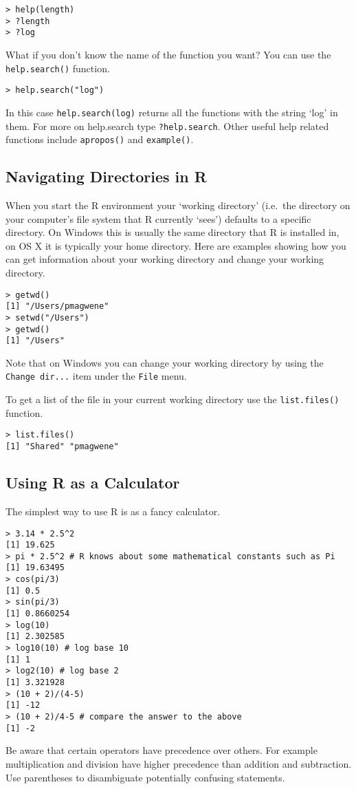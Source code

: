 \documentclass{article}
\begin{document}
\begin{lstlisting}
> help(length)
> ?length 
> ?log
\end{lstlisting}
What if you don't know the name of the function you want? You can use
the \lstinline!help.search()! function.

\begin{lstlisting}
> help.search("log")
\end{lstlisting}
In this case \lstinline!help.search(log)! returns all the functions with
the string `log' in them. For more on help.search type
\lstinline!?help.search!. Other useful help related functions include
\lstinline!apropos()! and \lstinline!example()!.

\subsection{Navigating Directories in R}

When you start the R environment your `working directory' (i.e.~the
directory on your computer's file system that R currently `sees')
defaults to a specific directory. On Windows this is usually the same
directory that R is installed in, on OS X it is typically your home
directory. Here are examples showing how you can get information about
your working directory and change your working directory.

\begin{lstlisting}
> getwd() 
[1] "/Users/pmagwene"
> setwd("/Users") 
> getwd() 
[1] "/Users"
\end{lstlisting}
Note that on Windows you can change your working directory by using the
\lstinline!Change dir...! item under the \lstinline!File! menu.

To get a list of the file in your current working directory use the
\lstinline!list.files()! function.

\begin{lstlisting}
> list.files() 
[1] "Shared" "pmagwene"
\end{lstlisting}
\subsection{Using R as a Calculator}

The simplest way to use R is as a fancy calculator.

\begin{lstlisting}
> 3.14 * 2.5^2
[1] 19.625
> pi * 2.5^2 # R knows about some mathematical constants such as Pi 
[1] 19.63495
> cos(pi/3)
[1] 0.5
> sin(pi/3)
[1] 0.8660254
> log(10)
[1] 2.302585
> log10(10) # log base 10
[1] 1
> log2(10) # log base 2
[1] 3.321928
> (10 + 2)/(4-5)
[1] -12
> (10 + 2)/4-5 # compare the answer to the above
[1] -2
\end{lstlisting}
Be aware that certain operators have precedence over others. For example
multiplication and division have higher precedence than addition and
subtraction. Use parentheses to disambiguate potentially confusing
statements.
\end{document}
